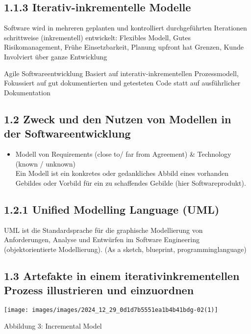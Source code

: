 \subsection*{1.1.3 Iterativ-inkrementelle Modelle}
Software wird in mehreren geplanten und kontrolliert durchgeführten Iterationen schrittweise (inkrementell) entwickelt: Flexibles Modell, Gutes Risikomanagement, Frühe Einsetzbarkeit, Planung upfront hat Grenzen, Kunde Involviert über ganze Entwicklung

Agile Softwareentwicklung Basiert auf interativ-inkrementellen Prozessmodell, Fokussiert auf gut dokumentierten und getesteten Code statt auf ausführlicher Dokumentation

\subsection*{1.2 Zweck und den Nutzen von Modellen in der Softwareentwicklung}
\begin{itemize}
  \item Modell von Requirements (close to/ far from Agreement) \& Technology (known / unknown)\\
Ein Modell ist ein konkretes oder gedankliches Abbild eines vorhanden Gebildes oder Vorbild für ein zu schaffendes Gebilde (hier Softwareprodukt).
\end{itemize}

\subsection*{1.2.1 Unified Modelling Language (UML)}
UML ist die Standardsprache für die graphische Modellierung von Anforderungen, Analyse und Entwürfen im Software Engineering (objektorientierte Modellierung). (As a sketch, blueprint, programminglanguage)

\subsection*{1.3 Artefakte in einem iterativinkrementellen Prozess illustrieren und einzuordnen}
\begin{center}
\texttt{[image: images/images/2024\_12\_29\_0d1d7b5551ea1b4b41bdg-02(1)]}
\end{center}

Abbildung 3: Incremental Model